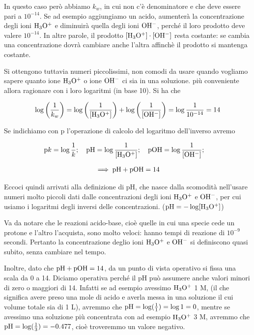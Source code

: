 In questo caso però abbiamo $k_w$, in cui non c'è denominatore e che deve essere pari a $10^{-14}$. Se ad esempio aggiungiamo un acido, aumenterà la concentrazione degli ioni $\rm H_3O^+$ e diminuirà quella degli ioni $\rm OH^-$, perché il loro prodotto deve valere $10^{-14}$. In altre parole, il prodotto $\rm [H_3O^+] \cdot [OH^-]$ resta costante: se cambia una concentrazione dovrà cambiare anche l'altra affinchè il prodotto si mantenga costante.

Si ottengono tuttavia numeri piccolissimi, non comodi da usare quando vogliamo sapere quanto ione $\rm H_3O^+$ o ione $\rm OH^-$ ci sia in una soluzione. \E più conveniente allora ragionare con i loro logaritmi (in base 10). Si ha che

$$\log \left( \frac{1}{k_w} \right) = \log \left( \frac{1}{\rm{[H_3O^+]}} \right) + \log \left( \frac{1}{\rm{[OH^-]}} \right) = \log \frac{1}{10^{-14}}=14$$

Se indichiamo con p l'operazione di calcolo del logaritmo dell'inverso avremo

$$\text{p}k = \log \frac{1}{k}; \quad \rm pH = \log \frac{1}{[H_3O^+]}; \quad pOH = \log \frac{1}{[OH^-]}; \quad$$

$$\implies \rm pH + pOH = 14$$

Eccoci quindi arrivati alla definizione di pH, che nasce dalla scomodità nell'usare numeri molto piccoli dati dalle concentrazioni degli ioni $\rm H_3O^+$ e $\rm OH^-$, per cui usiamo i logaritmi degli inversi delle concentrazioni. ($\rm pH=-\log[H_3O^+]$)

Va da notare che le reazioni acido-base, cioè quelle in cui una specie cede un protone e l'altro l'acquista, sono molto veloci: hanno tempi di reazione di $10^{-9}$ secondi. Pertanto la concentrazione deglio ioni $\rm H_3O^+$ e $\rm OH^-$ si definiscono quasi subito, senza cambiare nel tempo.

\vspace{0.2cm}Inoltre, dato che $\rm pH + pOH = 14$, da un punto di vista operativo si fissa una scala da 0 a 14. Diciamo operativa perché il pH può assumere anche valori minori di zero o maggiori di 14. Infatti se ad esempio avessimo $\rm H_3O^+$ 1 M, (il che significa avere preso una mole di acido e averla messa in una soluzione il cui volume totale sia di 1 L), avremmo che $\rm pH=\log(\frac{1}{1})=\log{1}=0$, mentre se avessimo una soluzione più concentrata con ad esempio $\rm H_3O^+$ 3 M, avremmo che $\rm pH=\log(\frac{1}{3})=-0.477$, cioè troveremmo un valore negativo.


